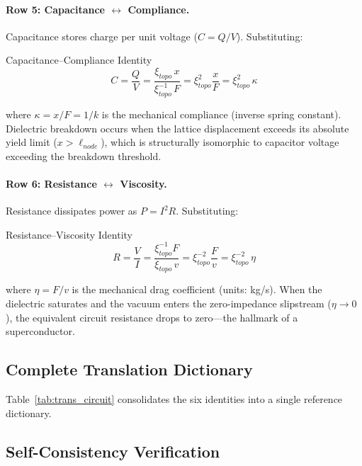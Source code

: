 \paragraph{Row 5: Capacitance $\leftrightarrow$ Compliance.}
Capacitance stores charge per unit voltage ($C = Q/V$). Substituting:
\begin{resultbox}{Capacitance--Compliance Identity}
\begin{equation}
    C = \frac{Q}{V} = \frac{\xi_{topo}\, x}{\xi_{topo}^{-1}\, F} = \xi_{topo}^{2} \frac{x}{F} = \xi_{topo}^{2}\, \kappa
    \label{eq:capacitance_compliance}
\end{equation}
\end{resultbox}
\noindent where $\kappa = x/F = 1/k$ is the mechanical compliance (inverse spring constant). Dielectric breakdown occurs when the lattice displacement exceeds its absolute yield limit ($x > \ell_{node}$), which is structurally isomorphic to capacitor voltage exceeding the breakdown threshold.

\paragraph{Row 6: Resistance $\leftrightarrow$ Viscosity.}
Resistance dissipates power as $P = I^2 R$. Substituting:
\begin{resultbox}{Resistance--Viscosity Identity}
\begin{equation}
    R = \frac{V}{I} = \frac{\xi_{topo}^{-1} F}{\xi_{topo}\, v} = \xi_{topo}^{-2} \frac{F}{v} = \xi_{topo}^{-2}\, \eta
    \label{eq:resistance_viscosity}
\end{equation}
\end{resultbox}
\noindent where $\eta = F/v$ is the mechanical drag coefficient (units: kg/s). When the dielectric saturates and the vacuum enters the zero-impedance slipstream ($\eta \to 0$), the equivalent circuit resistance drops to zero---the hallmark of a superconductor.

\subsection{Complete Translation Dictionary}

Table~\ref{tab:trans_circuit} consolidates the six identities into a single reference dictionary.



\subsection{Self-Consistency Verification}

